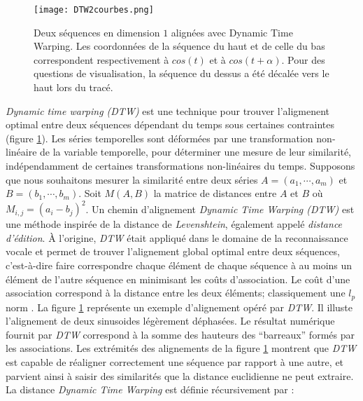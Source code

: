\begin{figure}[htb!] 
\centering
\texttt{[image: DTW2courbes.png]}
\caption{Deux s\'equences en dimension $1$ align\'ees avec Dynamic Time Warping. Les coordonn\'ees de la s\'equence du haut et de celle du bas correspondent respectivement \`a
$cos(t)$ et \`a $cos(t+\alpha)$. 
Pour des questions de visualisation, la s\'equence du dessus a \'et\'e d\'ecal\'ee vers le haut lors du trac\'e. \cite{petitjean2011descriptionDTWexemple}
}
\label{DTW2courbes}
\end{figure}

{\em Dynamic time warping (DTW) } est une technique pour trouver l'aligmenent optimal entre deux s\'equences d\'ependant du temps sous certaines contraintes (figure \ref{DTW2courbes}). 
Les s\'eries temporelles sont d\'eform\'ees par une transformation non-lin\'eaire de la variable temporelle, pour d\'eterminer une mesure de leur similarit\'e, ind\'ependamment de certaines transformations non-lin\'eaires du temps.
\newline
Supposons que nous souhaitons mesurer la similarit\'e entre deux s\'eries $A = (a_1, \cdots, a_m)$ et $B = (b_1, \cdots, b_m)$.
Soit $M(A,B)$ la matrice de distances entre $A$ et $B$ o\`u $M_{i,j} = (a_i - b_j)^2$.
Un chemin d'alignement {\em Dynamic Time Warping (DTW)} est une m\'ethode inspir\'ee de la distance de {\em Levenshtein}, \'egalement appel\'e {\em distance d'\'edition}. \`A l'origine, {\em DTW} \'etait appliqu\'e  dans le domaine de la reconnaissance vocale et permet de trouver l'alignement global optimal entre deux s\'equences, c'est-\`a-dire faire correspondre chaque \'el\'ement de chaque s\'equence \`a au moins un \'el\'ement de l'autre s\'equence en minimisant les co\^uts d'association. 
Le co\^ut d'une association correspond \`a la distance entre les deux \'el\'ements; classiquement une $l_p$ norm \cite{chen2004marriageLpNorm}.
La figure \ref{DTW2courbes} repr\'esente un exemple d'alignement op\'er\'e par {\em DTW}.
Il illuste l'alignement de deux sinusoides l\'eg\`erement d\'ephas\'ees. Le r\'esultat num\'erique fournit par {\em DTW} correspond \`a la somme des hauteurs des ``barreaux'' form\'es par les associations. Les extr\'emit\'es des alignements de la figure \ref{DTW2courbes} montrent que {\em DTW} est capable de r\'ealigner correctement une s\'equence par rapport \`a une autre, et parvient ainsi \`a saisir des similarit\'es que la
distance euclidienne ne peut extraire.
\newline
La distance {\em Dynamic Time Warping} est d\'efinie r\'ecursivement par :
